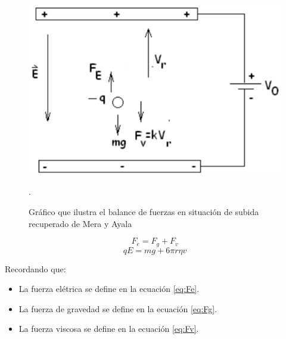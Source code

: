 \documentclass[
 reprint,
 amsmath,amssymb,
 aps,
]{revtex4-2}
\begin{document}
\begin{figure}[H]
    \centering
    \includegraphics[width=0.7\linewidth]{Screenshot 2025-04-02 at 15.10.25.png}
    \caption{Gráfico que ilustra el balance de fuerzas en situación de subida recuperado de Mera y Ayala \cite{Mera_Ayala_2015}}.
    \label{fig:balance}
\end{figure}
\begin{equation}
    F_e=F_g+F_v
\end{equation}
\begin{equation}
    qE=mg+6 \pi r \eta v
\end{equation}

Recordando que:
\begin{itemize}
    \item La fuerza elétrica se define en la ecuación \ref{eq:Fe}.
    \item La fuerza de gravedad se define en la ecuación \ref{eq:Fg}.
    \item La fuerza viscosa se define en la ecuación \ref{eq:Fv}.
\end{itemize}
\end{document}
